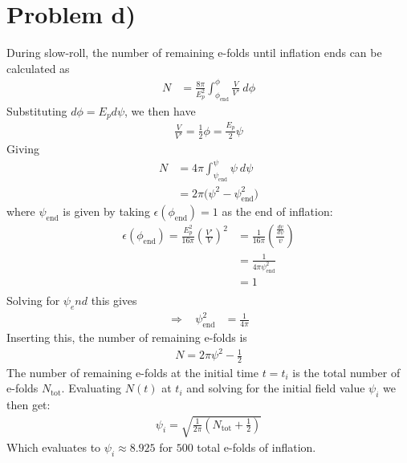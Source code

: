 \documentclass[reprint,english,notitlepage]{revtex4-1}  %
\numberwithin{equation}{section}
\begin{document}
\section{Problem d)}
During slow-roll, the number of remaining e-folds until inflation ends can be
calculated as
\begin{align}
	N &= \frac{8\pi}{E_p^2} \int_{\phi_{\mathrm{end}}}^\phi \frac{V}{V'}\ d\phi
\end{align}
Substituting $d\phi = E_p d\psi$, we then have
\begin{align}
	\frac{V}{V'} = \frac{1}{2}\phi = \frac{E_p}{2}\psi
\end{align}
Giving
\begin{align}
	N &= 4\pi \int_{\psi_{\mathrm{end}}}^\psi \psi\ d\psi \\
	  &= 2\pi \bigg( \psi^2 - \psi_{\mathrm{end}}^2 \bigg)	\label{eq:N-psi_i}
\end{align}
where $\psi_{\mathrm{end}}$ is given by taking $\epsilon(\phi_{\mathrm{end}})=1$
as the end of inflation:
\begin{align}
	\epsilon(\phi_{\mathrm{end}}) = \frac{E_p^2}{16\pi} \left(\frac{V'}{V}\right)^2
	 	&= \frac{1}{16\pi}\left(\frac{\frac{dv}{d\psi}}{v}\right) \\
											 &= \frac{1}{4\pi \psi_{\mathrm{end}}^2} \\
											 &= 1 \\
\end{align}
Solving for $\psi_end$ this gives
\begin{align}
	\Rightarrow \ \ \ \ \psi_{\mathrm{end}}^2 &= \frac{1}{4\pi}
\end{align}
Inserting this, the number of remaining e-folds is
\begin{align}
	N = 2\pi \psi^2 - \frac{1}{2}
\end{align}
The number of remaining e-folds at the initial time $t=t_i$ is
the total number of e-folds $N_{\mathrm{tot}}$. Evaluating $N(t)$ at $t_i$ and solving for
the initial field value $\psi_i$ we then get:
\begin{align}
	\psi_i = \sqrt{ \frac{1}{2\pi} \left(N_{\mathrm{tot}} + \frac{1}{2} \right) }
\end{align}
Which evaluates to $\psi_i \approx 8.925$ for $500$ total e-folds of inflation.
\end{document}
